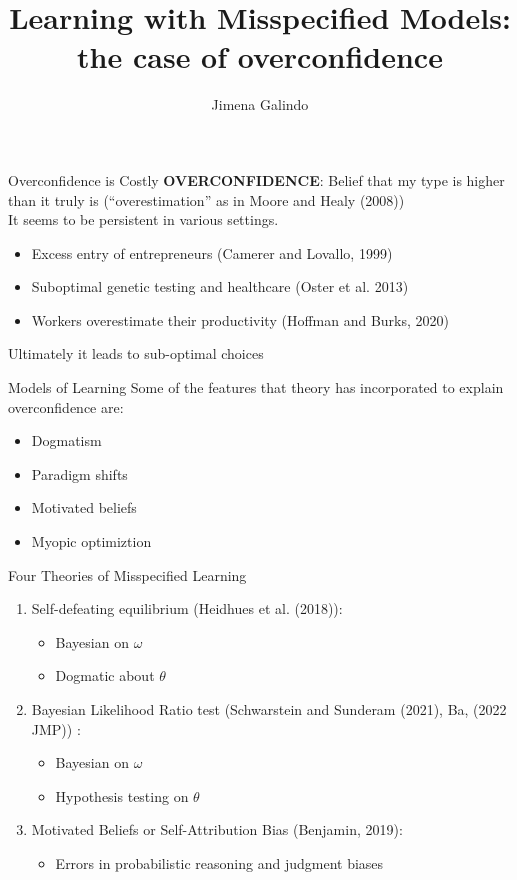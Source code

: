 \documentclass[aspectratio=169]{beamer}
\title{Learning with Misspecified Models:\\  the case of overconfidence}
\author{Jimena Galindo}
\begin{document}
\frame{\titlepage}

\begin{frame}{Overconfidence is Costly}
    \textbf{OVERCONFIDENCE}: Belief that my type is higher than it truly is (``overestimation'' as in Moore and Healy (2008))\\
    \bigskip
    \pause
    It seems to be persistent in various settings. 
    \begin{itemize} 
        \item Excess entry of entrepreneurs (Camerer and Lovallo, 1999)
        \item Suboptimal genetic testing and healthcare (Oster et al. 2013)
        \item  Workers overestimate their productivity (Hoffman and Burks, 2020)
    \end{itemize}
    \bigskip
    \alert{Ultimately it leads to sub-optimal choices}
    
\end{frame}

\begin{frame}{Models of Learning}
    Some of the features that theory has incorporated to explain overconfidence are:
    \begin{itemize}
        \item Dogmatism
        \item Paradigm shifts
        \item Motivated beliefs
        \item Myopic optimiztion
    \end{itemize}
\end{frame}

\begin{frame}{Four Theories of Misspecified Learning}
    \begin{enumerate}
        \item Self-defeating equilibrium (Heidhues et al. (2018)): 
        \begin{itemize}
            \item Bayesian on $\omega$
            \item Dogmatic about $\theta$
            
        \end{itemize}
        \item Bayesian Likelihood Ratio test (Schwarstein and Sunderam (2021), Ba, (2022 JMP)) :
        \begin{itemize}
            \item Bayesian on $\omega$ 
            \item Hypothesis testing on $\theta$
        \end{itemize}
        \item Motivated Beliefs or Self-Attribution Bias (Benjamin, 2019): 
        \begin{itemize}
            \item Errors in probabilistic reasoning and judgment biases
        \end{itemize}
    \end{enumerate}
    
\end{frame}
\end{document}
